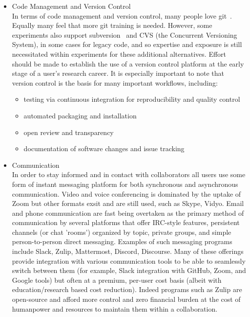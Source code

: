 \begin{itemize} 
  \item Code Management and Version Control\\
In terms of code management and version control, many people love git~\cite{chacon2014pro}. Equally many feel that more git training is needed. However, some experiments also support subversion~\cite{subversion} and CVS (the Concurrent Versioning System), in some cases for legacy code, and so expertise and exposure is still necessitated
within experiments for these additional alternatives. Effort should be made to establish the use of a version control platform at the early stage of a user's research career. It is especially important to note that version control is the basis for many important workflows, including:
  \begin{itemize}
    \item testing via continuous integration for reproducibility and quality control
    \item automated packaging and installation
    \item open review and transparency
    \item documentation of software changes and issue tracking       
  \end{itemize}
  \item Communication\\
In order to stay informed and in contact with collaborators all users use some form of instant messaging platform for both synchronous and asynchronous communication. Video and voice conferencing is dominated by the uptake of Zoom but other formats exsit and are still used, such as Skype, Vidyo. Email and phone communication are fast being overtaken as the primary method of communication by several platforms that offer IRC-style features, persistent channels (or chat 'rooms') organized by topic, private groups, and simple person-to-person direct messaging. Examples of such messaging programs include Slack, Zulip, Mattermost, Discord, Discourse. 
Many of these offerings provide integration with various communication tools to be able to seamlessly switch between them (for example, Slack integration with GitHub, Zoom, and Google tools) but often at a premium, per-user cost basis (albeit with education/research based cost reduction). Indeed programs such as Zulip are open-source and afford more control and zero financial burden at the cost of humanpower and resources to maintain them within a collaboration.

\end{itemize}
